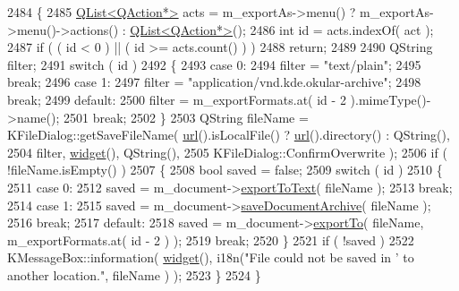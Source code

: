\begin{DoxyCode}
2484 \{
2485     \hyperlink{classQList}{QList<QAction*>} acts = m\_exportAs->menu() ? m\_exportAs->menu()->actions() : 
      \hyperlink{classQList}{QList<QAction*>}();
2486     \textcolor{keywordtype}{int} \textcolor{keywordtype}{id} = acts.indexOf( act );
2487     \textcolor{keywordflow}{if} ( ( \textcolor{keywordtype}{id} < 0 ) || ( \textcolor{keywordtype}{id} >= acts.count() ) )
2488         \textcolor{keywordflow}{return};
2489 
2490     QString filter;
2491     \textcolor{keywordflow}{switch} ( \textcolor{keywordtype}{id} )
2492     \{
2493         \textcolor{keywordflow}{case} 0:
2494             filter = \textcolor{stringliteral}{"text/plain"};
2495             \textcolor{keywordflow}{break};
2496         \textcolor{keywordflow}{case} 1:
2497             filter = \textcolor{stringliteral}{"application/vnd.kde.okular-archive"};
2498             \textcolor{keywordflow}{break};
2499         \textcolor{keywordflow}{default}:
2500             filter = m\_exportFormats.at( \textcolor{keywordtype}{id} - 2 ).mimeType()->name();
2501             \textcolor{keywordflow}{break};
2502     \}
2503     QString fileName = KFileDialog::getSaveFileName( \hyperlink{classKParts_1_1ReadOnlyPart_aba05c3b2fd42dcfebc6585e4f746d2cb}{url}().isLocalFile() ? 
      \hyperlink{classKParts_1_1ReadOnlyPart_aba05c3b2fd42dcfebc6585e4f746d2cb}{url}().directory() : QString(),
2504                                                      filter, \hyperlink{classKParts_1_1Part_a134900cb0605a1cd5113d90954a01fdf}{widget}(), QString(),
2505                                                      KFileDialog::ConfirmOverwrite );
2506     \textcolor{keywordflow}{if} ( !fileName.isEmpty() )
2507     \{
2508         \textcolor{keywordtype}{bool} saved = \textcolor{keyword}{false};
2509         \textcolor{keywordflow}{switch} ( \textcolor{keywordtype}{id} )
2510         \{
2511             \textcolor{keywordflow}{case} 0:
2512                 saved = m\_document->\hyperlink{classOkular_1_1Document_a7f78a55a2c779daa2cb77af7c11b1c37}{exportToText}( fileName );
2513                 \textcolor{keywordflow}{break};
2514             \textcolor{keywordflow}{case} 1:
2515                 saved = m\_document->\hyperlink{classOkular_1_1Document_aa5e6cbdeb702f6671847ca94b63a277a}{saveDocumentArchive}( fileName );
2516                 \textcolor{keywordflow}{break};
2517             \textcolor{keywordflow}{default}:
2518                 saved = m\_document->\hyperlink{classOkular_1_1Document_a1f77c325fb8d44dcac9e8bbdda442653}{exportTo}( fileName, m\_exportFormats.at( \textcolor{keywordtype}{id} - 2 ) );
2519                 \textcolor{keywordflow}{break};
2520         \}
2521         \textcolor{keywordflow}{if} ( !saved )
2522             KMessageBox::information( \hyperlink{classKParts_1_1Part_a134900cb0605a1cd5113d90954a01fdf}{widget}(), i18n(\textcolor{stringliteral}{"File could not be saved in '%
       to another location."}, fileName ) );
2523     \}
2524 \}
\end{DoxyCode}
